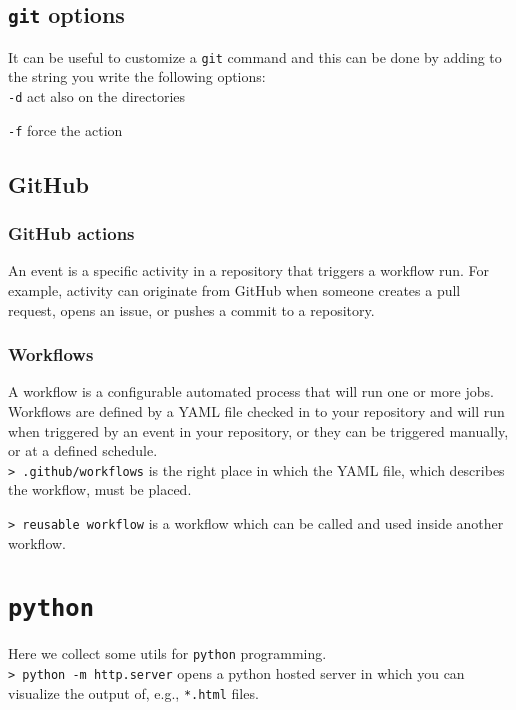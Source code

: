 \documentclass[11pt]{article}
\newcommand{\cmd}[1]{\colorbox{light-gray}{\textcolor{gio}{\texttt{#1}}}}
\begin{document}
\begin{multicols}{2}
\subsection{\texttt{git} options}

It can be useful to customize a \texttt{git} command and this can be done by adding 
to the string you write the following options: \\

\cmd{-d} act also on the directories

\cmd{-f} force the action

\subsection{GitHub}

\subsubsection{GitHub actions}

An event is a specific activity in a repository that triggers a workflow run. 
For example, activity can originate from GitHub when someone creates a pull request, 
opens an issue, or pushes a commit to a repository.

\subsubsection{Workflows}

A workflow is a configurable automated process that will run one or more jobs. 
Workflows are defined by a YAML file checked in to your repository and will run 
when triggered by an event in your repository, or they can be triggered manually, 
or at a defined schedule. \\

\cmd{> .github/workflows} is the right place in which the YAML file, which 
describes the workflow, must be placed.

\cmd{> reusable workflow} is a workflow which can be called and used inside 
another workflow.

\section{\texttt{python}}

Here we collect some utils for \texttt{python} programming. \\

\cmd{> python -m http.server} opens a python hosted server in which you can 
visualize the output of, e.g., \texttt{*.html} files.


\end{multicols}
\end{document}
